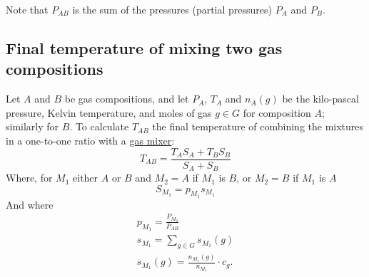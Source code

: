 \documentclass{article}
\begin{document}
Note that $P_{AB}$ is the sum of the pressures (partial pressures)
$P_A$ and $P_B$.

\subsection{Final temperature of mixing two gas compositions}

Let $A$ and $B$ be gas compositions, and let $P_A$, $T_A$ and $n_A(g)$ be the
kilo-pascal pressure, Kelvin temperature, and moles of gas $g\in G$ for
composition $A$; similarly for $B$.
To calculate $T_{AB}$ the final temperature of combining the mixtures in a
one-to-one ratio with a \href{https://stationeers-wiki.com/Pipe_Gas_Mixer}{gas mixer}:
\begin{equation}
    T_{AB}
    = \frac{T_A S_A+T_B S_B}{S_A+S_B}
\end{equation}
Where, for $M_1$ either $A$ or $B$ and
$M_2=A$ if $M_1$ is $B$, or
$M_2=B$ if $M_1$ is $A$
\begin{equation}
    S_{M_1} = p_{M_1}s_{M_1}
\end{equation}
And where
\begin{gather}
    p_{M_1} = \frac{P_{M_2}}{P_{AB}} \\
    s_{M_1} = \sum_{g\in G}s_{M_1}(g) \\
    s_{M_1}(g) = \frac{n_{M_1}(g)}{n_{M_1}}\cdot c_g.
\end{gather}

\inputminted{text}{final-temp.mips}
\end{document}
